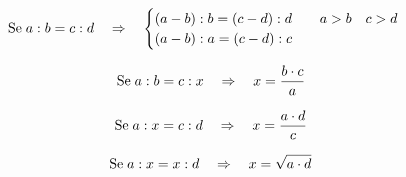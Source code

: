 \begin{prop}
\begin{equation*}                       
\text{Se\;}a:b=c:d\quad\Rightarrow\quad \begin{cases}
(a-b):b=(c-d):d\qquad a>b\quad c>d\\
(a-b):a=(c-d):c
\end{cases}
\end{equation*}
\end{prop}
\begin{prop}
\begin{equation*}                       
\text{Se\;}a:b=c:x\quad\Rightarrow\quad x=\dfrac{b\cdot c}{a}
\end{equation*}
\end{prop}
\begin{prop}
\begin{equation*}                       
\text{Se\;}a:x=c:d\quad\Rightarrow\quad x=\dfrac{a\cdot d}{c}
\end{equation*}
\end{prop}
\begin{prop}
\begin{equation*}                       
\text{Se\;}a:x=x:d\quad\Rightarrow\quad x=\sqrt{a\cdot d}
\end{equation*}
\end{prop}
